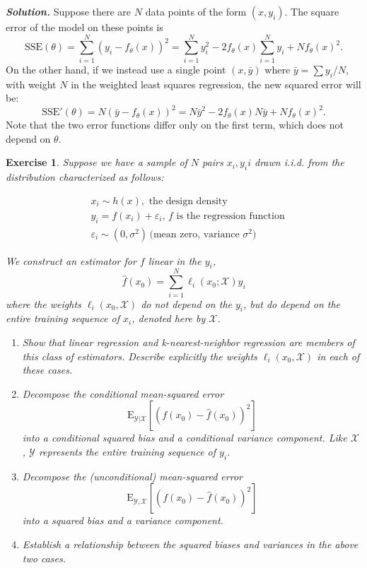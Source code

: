 \documentclass[12pt]{article}
\def\eps{\varepsilon}
\def\eps{\varepsilon}
\def\E{\text{E}}
\newtheorem{exercise}{Exercise}[section]
\newenvironment{solution}[1][\it{Solution}]{\textbf{#1. } }{\vspace{.5cm}}
\begin{document}
\begin{solution}
	Suppose there are $N$ data points of the form $(x, y_i)$. The square error of the model on these points is 
	$$\text{SSE}(\theta) = \sum_{i=1}^N (y_i - f_\theta(x))^2 = \sum_{i=1}^N y_i^2 - 2 f_\theta(x)\sum_{i=1}^N y_i + Nf_\theta(x)^2.$$
	On the other hand, if we instead use a single point $(x, \bar{y})$ where $\bar{y} = \sum y_i/ N$, with weight $N$ in the weighted least squares regression, the new squared error will be:
	$$\text{SSE}'(\theta) = N (\bar{y} - f_\theta(x))^2 = N \bar{y}^2 - 2 f_\theta(x) N \bar{y} + Nf_\theta(x)^2.$$
	Note that the two error functions differ only on the first term, which does not depend on $\theta$. 
\end{solution}


\begin{exercise}
    Suppose we have a sample of $N$ pairs $x_i, y_ii$ drawn i.i.d. from the distribution characterized as follows:
    \begin{center}
    $$\begin{aligned}&x_i \sim h(x), \text{ the design density}\\
    &y_i = f(x_i) + \varepsilon_i, \, f \text{ is the regression function}\\
    &\eps_i \sim (0, \sigma^2)\, \text{(mean zero, variance $\sigma^2$)}
    \end{aligned}$$
    \end{center}
    We construct an estimator for $f$ linear in the $y_i$,
$$\hat{f}(x_0) = \sum_{i = 1}^N \ell_i(x_0; \mathcal{X})y_i$$
where the weights $\ell_i(x_0, \mathcal{X})$ do not depend on the $y_i$, but do depend on the
entire training sequence of $x_i$, denoted here by $\mathcal{X}$.
\begin{enumerate}
\item[(a)] Show that linear regression and k-nearest-neighbor regression are members
of this class of estimators. Describe explicitly the weights $\ell_i(x_0, \mathcal{X})$
in each of these cases.
\item[(b)] Decompose the conditional mean-squared error
$$\E_{\mathcal{Y}| \mathcal{X}}[(f(x_0) - \hat{f}(x_0))^2]$$
into a conditional squared bias and a conditional variance component.
Like $\mathcal{X}$, $\mathcal{Y}$ represents the entire training sequence of $y_i$.
\item[(c)] Decompose the (unconditional) mean-squared error
$$\E_{\mathcal{Y}, \mathcal{X}}[(f(x_0) - \hat{f}(x_0))^2]$$
into a squared bias and a variance component.
\item[(d)] Establish a relationship between the squared biases and variances in
the above two cases.
\end{enumerate}
\end{exercise}
\end{document}
